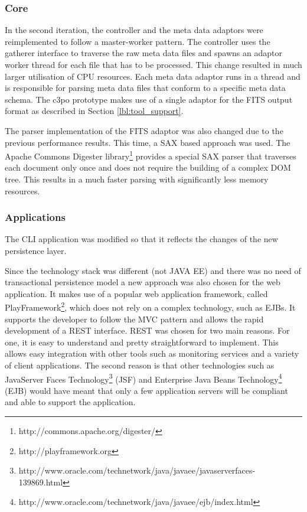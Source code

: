 \subsubsection{Core}
In the second iteration, the controller and the meta data adaptors were reimplemented to follow a master-worker pattern.
The controller uses the gatherer interface to traverse the raw meta data files and spawns an adaptor worker thread for each file that has to be processed. This change resulted in much larger utilisation of CPU resources. Each meta data adaptor runs in a thread and is responsible for parsing meta data files that conform to a specific meta data schema. The c3po prototype makes use of a single adaptor for the FITS output format as described in Section \ref{lbl:tool_support}. 

The parser implementation of the FITS adaptor was also changed due to the previous performance results. This time, a SAX based approach was used. The Apache Commons Digester library\footnote{http://commons.apache.org/digester/} provides a special SAX parser that traverses each document only once and does not require the building of a complex DOM tree. This results in a much faster parsing with significantly less memory resources.

\subsubsection{Applications}
The CLI application was modified so that it reflects the changes of the new persistence layer.

Since the technology stack was different (not JAVA EE) and there was no need of transactional persistence model a new approach was also chosen for the web application. It makes use of a popular web application framework, called PlayFramework\footnote{http://playframework.org}, which does not rely on a complex technology, such as EJBs. It supports the developer to follow the MVC pattern and allows the rapid development of a REST \cite{Fielding:2000:ASD:932295} interface. REST was chosen for two main reasons. For one, it is easy to understand and pretty straightforward to implement. This allows easy integration with other tools such as monitoring services and a variety of client applications. The second reason is that other technologies such as JavaServer Faces Technology\footnote{http://www.oracle.com/technetwork/java/javaee/javaserverfaces-139869.html} (JSF) and Enterprise Java Beans Technology\footnote{http://www.oracle.com/technetwork/java/javaee/ejb/index.html} (EJB) would have meant that only a few application servers will be compliant and able to support the application.

